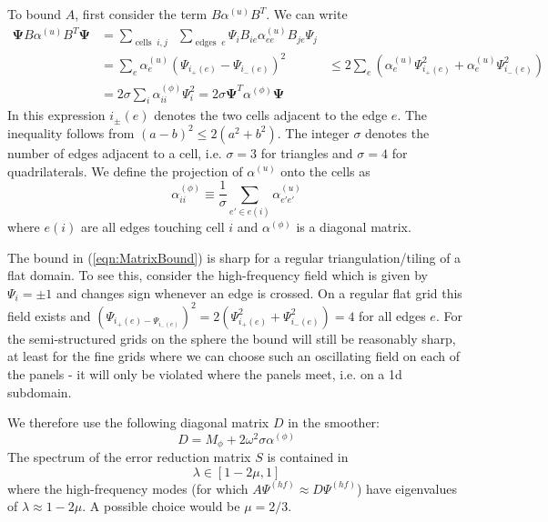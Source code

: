 \documentclass[12pt]{article}
\renewcommand{\vec}[1]{\boldsymbol{#1}}
\begin{document}
To bound $A$, first consider the term $B\alpha^{(u)} B^T$. We can write
\begin{equation}
 \begin{aligned}
  \vec{\Psi} B \alpha^{(u)} B^T \vec{\Psi} &= \sum_{\operatorname{cells}\;i,j}\;\;\sum_{\operatorname{edges}\;e} \Psi_i B_{ie} \alpha^{(u)}_{ee} B_{je} \Psi_j 
\\
  &= \sum_{e} \alpha_e^{(u)} \left(\Psi_{i_+(e)}-\Psi_{i_-(e)}\right)^2
  & \le 2\sum_e\left(\alpha_e^{(u)} \Psi_{i_+(e)}^2+\alpha_e^{(u)} \Psi_{i_-(e)}^2\right)\\
  &= 2 \sigma \sum_i \alpha_{ii}^{(\phi)} \Psi_i ^2 = 2\sigma \vec{\Psi}^T \alpha^{(\phi)}\vec{\Psi}
 \end{aligned}\label{eqn:MatrixBound}
\end{equation}
In this expression $i_{\pm}(e)$ denotes the two cells adjacent to the edge $e$. The inequality follows from $(a-b)^2 \le 2(a^2+b^2)$. The integer $\sigma$ denotes the number of edges adjacent to a cell, i.e. $\sigma=3$ for triangles and $\sigma=4$ for quadrilaterals. We define the projection of $\alpha^{(u)}$ onto the  cells as 
\begin{equation}
  \alpha^{(\phi)}_{ii} \equiv \frac{1}{\sigma} \sum_{e'\in e(i)} \alpha_{e'e'}^{(u)}
\end{equation}
where $e(i)$ are all edges touching cell $i$ and $\alpha^{(\phi)}$ is a diagonal matrix.

The bound in (\ref{eqn:MatrixBound}) is sharp for a regular triangulation/tiling of a flat domain. To see this, consider the high-frequency field which is given by $\Psi_i = \pm 1$ and changes sign whenever an edge is crossed. On a regular flat grid this field exists and $(\Psi_{i_+(e)-\Psi_{i_-(e)}})^2 = 2 (\Psi_{i_+(e)}^2+\Psi_{i_-(e)}^2) = 4$ for all edges $e$. For the semi-structured grids on the sphere the bound will still be reasonably sharp, at least for the fine grids where we can choose such an oscillating field on each of the panels - it will only be violated where the panels meet, i.e. on a 1d subdomain.

We therefore use the following diagonal matrix $D$ in the smoother:
\begin{equation}
  D = M_{\phi} + 2\omega^2 \sigma \alpha^{(\phi)}
\end{equation}
The spectrum of the error reduction matrix $S$ is contained in
\begin{equation}
  \lambda \in [1-2\mu,1]
\end{equation}
where the high-frequency modes (for which $A\Psi^{(hf)}\approx D\Psi^{(hf)}$) have eigenvalues of $\lambda \approx 1-2\mu$. A possible choice would be $\mu=2/3$.
\end{document}
